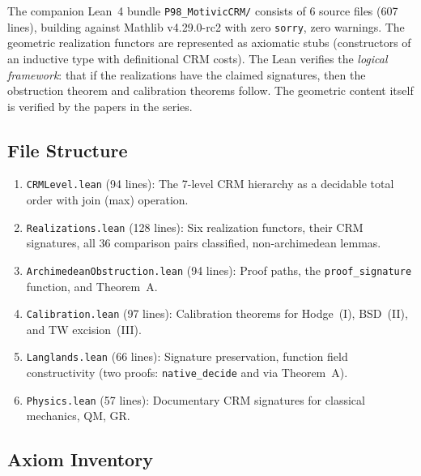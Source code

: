 \documentclass[11pt,a4paper]{article}
\theoremstyle{plain}
\theoremstyle{definition}
\begin{document}
The companion Lean~4 bundle \texttt{P98\_MotivicCRM/} consists of 6 source files (607 lines), building against Mathlib v4.29.0-rc2 with zero \texttt{sorry}, zero warnings. The geometric realization functors are represented as axiomatic stubs (constructors of an inductive type with definitional CRM costs). The Lean verifies the \emph{logical framework}: that if the realizations have the claimed signatures, then the obstruction theorem and calibration theorems follow. The geometric content itself is verified by the papers in the series.

\subsection{File Structure}

\begin{enumerate}[leftmargin=2.5em]
\item \texttt{CRMLevel.lean} (94 lines): The 7-level CRM hierarchy as a decidable total order with join (max) operation.
\item \texttt{Realizations.lean} (128 lines): Six realization functors, their CRM signatures, all 36 comparison pairs classified, non-archimedean lemmas.
\item \texttt{ArchimedeanObstruction.lean} (94 lines): Proof paths, the \texttt{proof\_signature} function, and Theorem~A.
\item \texttt{Calibration.lean} (97 lines): Calibration theorems for Hodge~(I), BSD~(II), and TW excision~(III).
\item \texttt{Langlands.lean} (66 lines): Signature preservation, function field constructivity (two proofs: \texttt{native\_decide} and via Theorem~A).
\item \texttt{Physics.lean} (57 lines): Documentary CRM signatures for classical mechanics, QM, GR.
\end{enumerate}

\subsection{Axiom Inventory}
\end{document}
